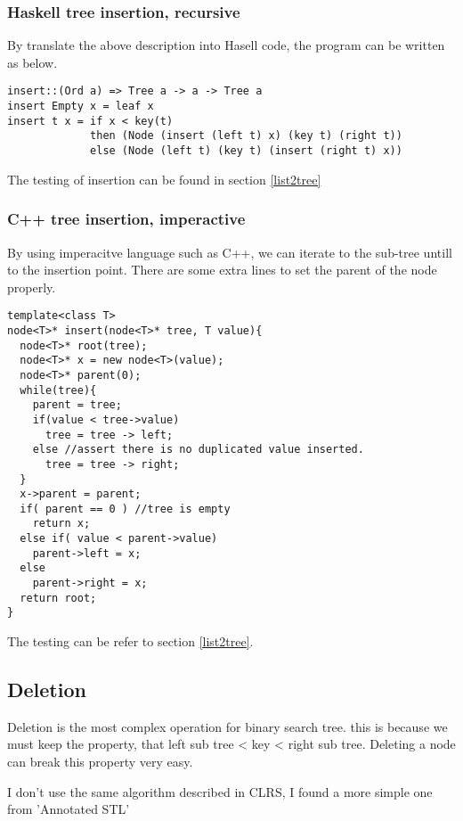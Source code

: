 \documentclass{article}
\begin{document}
\subsubsection*{Haskell tree insertion, recursive}
By translate the above description into Hasell code, the program can be written
as below.

\begin{lstlisting}
insert::(Ord a) => Tree a -> a -> Tree a
insert Empty x = leaf x
insert t x = if x < key(t) 
             then (Node (insert (left t) x) (key t) (right t))
             else (Node (left t) (key t) (insert (right t) x))
\end{lstlisting}

The testing of insertion can be found in section \ref{list2tree}

\subsubsection*{C++ tree insertion, imperactive}

By using imperacitve language such as C++, we can iterate to the sub-tree untill
to the insertion point. There are some extra lines to set the parent of the node
properly.

\lstset{language=C++}
\begin{lstlisting}
template<class T>
node<T>* insert(node<T>* tree, T value){
  node<T>* root(tree);
  node<T>* x = new node<T>(value);
  node<T>* parent(0);
  while(tree){
    parent = tree;
    if(value < tree->value)
      tree = tree -> left;
    else //assert there is no duplicated value inserted.
      tree = tree -> right;
  }
  x->parent = parent;
  if( parent == 0 ) //tree is empty
    return x;
  else if( value < parent->value)
    parent->left = x;
  else
    parent->right = x;
  return root;
}
\end{lstlisting}

The testing can be refer to section \ref{list2tree}.

\subsection{Deletion}
Deletion is the most complex operation for binary search tree. this is because we
must keep the property, that left sub tree < key < right sub tree. Deleting a node
can break this property very easy.

I don't use the same algorithm described in CLRS\cite{CLRS}, I found a more simple
one from 'Annotated STL'\cite{hj-stl}
\end{document}

